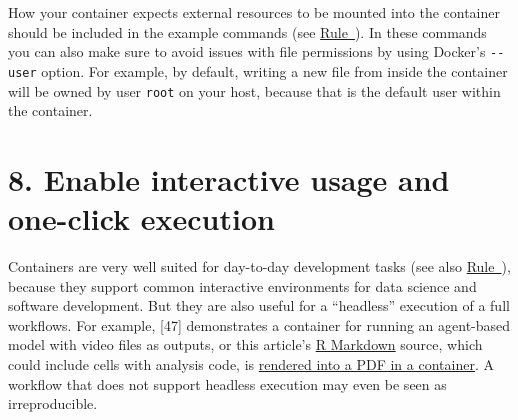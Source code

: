 \documentclass[10pt,letterpaper]{article}
\begin{document}
How your container expects external resources to be mounted into the
container should be included in the example commands (see
\hyperref[{rule:formatting}]{Rule~}). In
these commands you can also make sure to avoid issues with file
permissions by using Docker's \texttt{-\/-user} option. For example, by
default, writing a new file from inside the container will be owned by
user \texttt{root} on your host, because that is the default user within
the container.

\hypertarget{enable-interactive-usage-and-one-click-execution}{%
\section*{8. Enable interactive usage and one-click
execution}\label{enable-interactive-usage-and-one-click-execution}}

  \label{rule:interactive} 

Containers are very well suited for day-to-day development tasks (see
also \hyperref[{rule:usage}]{Rule~}), because they
support common interactive environments for data science and software
development. But they are also useful for a ``headless'' execution of a
full workflows. For example, {[}47{]} demonstrates a container for
running an agent-based model with video files as outputs, or this
article's \href{https://rmarkdown.rstudio.com/}{R Markdown} source,
which could include cells with analysis code, is
\href{https://github.com/nuest/ten-simple-rules-dockerfiles/blob/master/.travis.yml\#L18}{rendered
into a PDF in a container}. A workflow that does not support headless
execution may even be seen as irreproducible.
\end{document}
